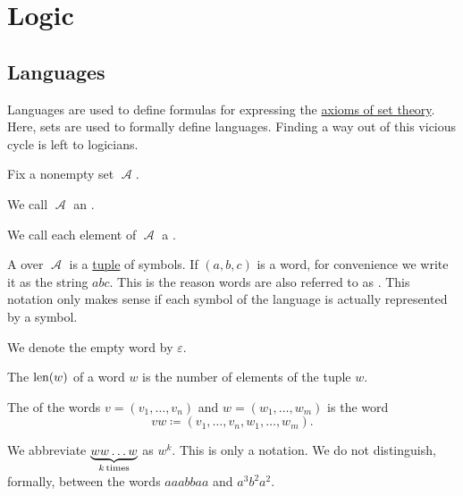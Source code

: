 \section{Logic}\label{sec:logic}
\subsection{Languages}\label{subsec:languages}

\begin{remark}\label{rem:language_definitions_using_sets}
  Languages are used to define formulas for expressing the \hyperref[def:set_zfc]{axioms of set theory}. Here, sets are used to formally define languages. Finding a way out of this vicious cycle is left to logicians.
\end{remark}

\begin{definition}\label{def:language}
  Fix a nonempty set \( \mscrA \).

  \begin{thmenum}
     We call \( \mscrA \) an .

     We call each element of \( \mscrA \) a .

     A  over \( \mscrA \) is a \hyperref[def:cartesian_product]{tuple} of symbols. If \( (a, b, c) \) is a word, for convenience we write it as the string \( abc \). This is the reason words are also referred to as . This notation only makes sense if each symbol of the language is actually represented by a symbol.

     We denote the empty word by \( \varepsilon \).

     The  \( \operatorname{len}(w) \) of a word \( w \) is the number of elements of the tuple \( w \).

     The  of the words \( v = (v_1, \ldots, v_n) \) and \( w = (w_1, \ldots, w_m) \) is the word
    \begin{equation*}
      vw \coloneqq (v_1, \ldots, v_n, w_1, \ldots, w_m).
    \end{equation*}

    We abbreviate \( \underbrace{w w \ldots w}_{k \mathop{\text{times}}} \) as \( w^k \). This is only a notation. We do not distinguish, formally, between the words \( aaabbaa \) and \( a^3 b^2 a^2 \).


\end{thmenum}
\end{definition}
